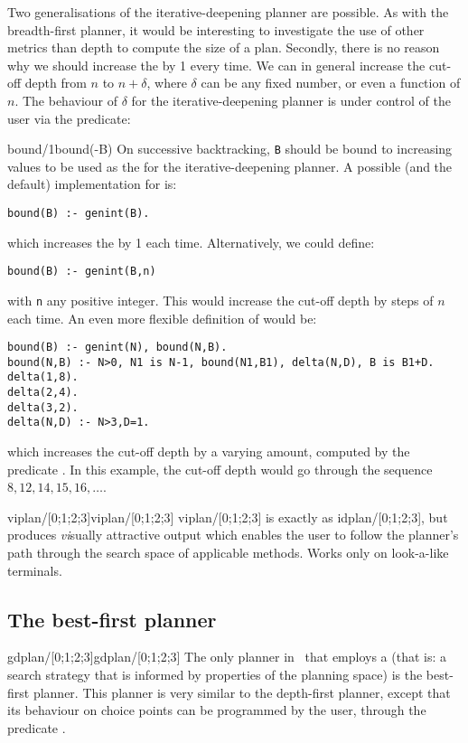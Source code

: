Two generalisations of the iterative-deepening planner are possible.
As with the breadth-first planner, it would be interesting to
investigate the use of other metrics than depth to compute the size of
a plan. Secondly, there is no reason why we should increase the
 by 1 every time. We can in general increase the cut-off
depth from $n$ to $n+\delta$, where $\delta$ can be any fixed number, or
even a function of $n$. The behaviour of $\delta$ for the
iterative-deepening planner is under control of the user via the
predicate:

\begin{predicate}{bound/1}{bound(-B)}%
On successive backtracking, {\tt B} should be bound to increasing values
to be used as the  for the iterative-deepening
planner. A possible (and the default) implementation for  is:
\begin{verbatim}
bound(B) :- genint(B).
\end{verbatim}
which increases the  by 1 each time. Alternatively, we
could define:
\begin{verbatim}
bound(B) :- genint(B,n)
\end{verbatim}
with {\tt n} any positive integer. This would increase the
cut-off depth by steps of $n$ each time. An even more flexible
definition of  would be:
\begin{verbatim}
bound(B) :- genint(N), bound(N,B).
bound(N,B) :- N>0, N1 is N-1, bound(N1,B1), delta(N,D), B is B1+D.
delta(1,8).
delta(2,4).
delta(3,2).
delta(N,D) :- N>3,D=1.
\end{verbatim}
which increases the cut-off depth by a varying amount, computed by the
predicate . In this example, the cut-off depth would go
through the sequence $8,12,14,15,16,\ldots$.
\end{predicate}

\begin{predicate}{viplan/[0;1;2;3]}{viplan/[0;1;2;3]}%
viplan/[0;1;2;3] is exactly as idplan/[0;1;2;3], but produces
{\em vi\/}sually attractive output which enables the user to follow the
planner's path through the search space of applicable methods. Works \notnice
only on  look-a-like terminals.
\end{predicate}

\subsection {The best-first planner}
\begin{predicate}{gdplan/[0;1;2;3]}{gdplan/[0;1;2;3]}
The only planner in \clam\ that employs a 
(that is: a search strategy that is informed by properties of the
planning space) is the best-first planner. This planner is very
similar to the depth-first planner, except that its behaviour on
choice points can be programmed by the user, through the predicate
.
\end{predicate}

